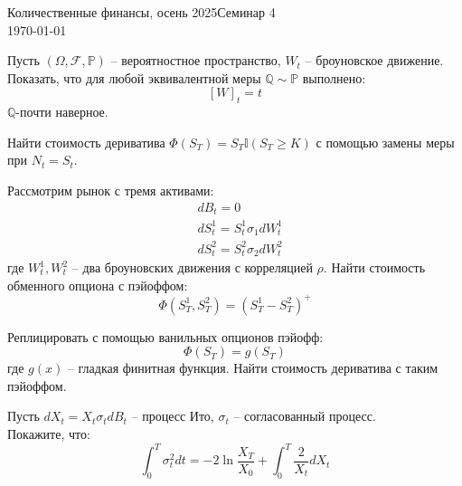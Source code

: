 \documentclass[12pt]{article}
\begin{document}
\noindent Количественные финансы, осень 2025\hfill Семинар 4\\
\today

\hrulefill

\begin{problem}
    Пусть $(\Omega, \mathcal{F}, \mathbb{P})$ -- вероятностное пространство, $W_t$ -- броуновское движение. Показать, что для любой эквивалентной меры 
    $\mathbb{Q} \sim \mathbb{P}$ выполнено:
    $$
        [W]_t = t
    $$ $\mathbb{Q}$-почти наверное.
\end{problem}

\begin{problem}
    Найти стоимость дериватива $\Phi(S_T) = S_T \mathbb{I}(S_T \geq K)$ с помощью замены меры при $N_t = S_t$.
\end{problem}

\begin{problem}
    Рассмотрим рынок с тремя активами:
    \begin{align*}
        &dB_t = 0\\
        &dS_t^1 = S_t^1 \sigma_1 dW_t^1 \\
        &dS_t^2 = S_t^2 \sigma_2 dW_t^2
    \end{align*}где $W_t^1, W_t^2$ -- два броуновских движения с корреляцией $\rho$. Найти стоимость обменного опциона с пэйоффом:
    $$
        \Phi(S_T^1, S_T^2) = (S_T^1 - S_T^2)^+
    $$
\end{problem}

\begin{problem}
    Реплицировать с помощью ванильных опционов пэйофф:
    $$
        \Phi(S_T) = g(S_T)
    $$где $g(x)$ -- гладкая финитная функция. Найти стоимость дериватива с таким пэйоффом.
\end{problem}

\begin{problem}
    Пусть $dX_t = X_t \sigma_t dB_t$ -- процесс Ито, $\sigma_t$ -- согласованный процесс.
    \\ Покажите, что:
    $$
        \int_0^T \sigma^2_t dt = -2\ln \dfrac{X_T}{X_0} + \int_0^T \dfrac{2}{X_t}dX_t
    $$
\end{problem}
\end{document}
